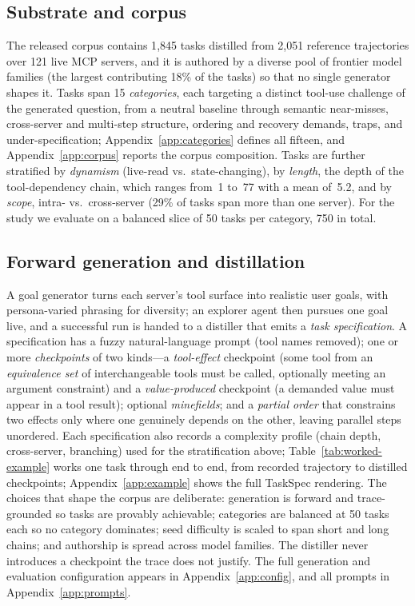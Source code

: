 \subsection{Substrate and corpus}
\label{sec:benchmark:substrate}
The released corpus contains 1{,}845 tasks distilled from 2{,}051 reference
trajectories over 121 live MCP servers, and it is authored by a diverse pool
of frontier model families (the largest contributing 18\% of the tasks) so
that no single generator shapes it. Tasks span 15 \emph{categories}, each
targeting a distinct tool-use challenge of the generated question, from a
neutral baseline through semantic near-misses, cross-server and multi-step
structure, ordering and recovery demands, traps, and under-specification;
Appendix~\ref{app:categories} defines all fifteen, and
Appendix~\ref{app:corpus} reports the corpus composition. Tasks are further stratified by
\emph{dynamism} (live-read vs.\ state-changing), by \emph{length}, the depth
of the tool-dependency chain, which ranges from~1 to~77 with a mean
of~5.2, and by \emph{scope}, intra- vs.\ cross-server (29\% of tasks span
more than one server). For the study we evaluate on a balanced slice of 50
tasks per category, 750 in total.

\subsection{Forward generation and distillation}
\label{sec:benchmark:gen}
A goal generator turns each server's tool surface into realistic user goals,
with persona-varied phrasing for diversity; an explorer agent then pursues
one goal live, and a successful run is handed to a distiller that emits a
\emph{task specification}. A specification has a fuzzy natural-language
prompt (tool names removed); one or more \emph{checkpoints} of two kinds---a
\emph{tool-effect} checkpoint (some tool from an \emph{equivalence set} of
interchangeable tools must be called, optionally meeting an argument
constraint) and a \emph{value-produced} checkpoint (a demanded value must
appear in a tool result); optional \emph{minefields}; and a \emph{partial
order} that constrains two effects only where one genuinely depends on the
other, leaving parallel steps unordered. Each specification also records a
complexity profile (chain depth, cross-server, branching) used for the
stratification above; Table~\ref{tab:worked-example} works one task through end to end, from
recorded trajectory to distilled checkpoints; Appendix~\ref{app:example}
shows the full TaskSpec rendering. The choices that shape the corpus are deliberate:
generation is forward and trace-grounded so tasks are provably achievable;
categories are balanced at 50 tasks each so no category dominates; seed
difficulty is scaled to span short and long chains; and authorship is spread
across model families. The distiller never introduces a checkpoint the trace
does not justify. The full generation and evaluation configuration appears in
Appendix~\ref{app:config}, and all prompts in Appendix~\ref{app:prompts}.


